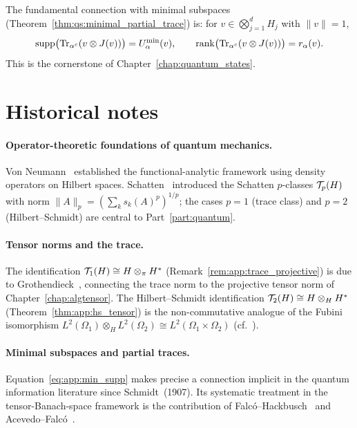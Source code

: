 \medskip\noindent
The fundamental connection with minimal subspaces
(Theorem~\ref{thm:qs:minimal_partial_trace}) is:
for $v \in \bigotimes_{j=1}^d H_j$ with $\|v\|=1$,
\begin{equation}
\label{eq:app:min_supp}
    \mathrm{supp}\bigl(\mathrm{Tr}_{\alpha^c}(v \otimes J(v))\bigr) = U^{\min}_{\alpha}(v),
    \qquad
    \mathrm{rank}\bigl(\mathrm{Tr}_{\alpha^c}(v \otimes J(v))\bigr) = r_\alpha(v).
\end{equation}
This is the cornerstone of Chapter~\ref{chap:quantum_states}.

\section{Historical notes}
\label{app:quantum:history}

\paragraph{Operator-theoretic foundations of quantum mechanics.}
Von Neumann~\cite{vonNeumann1932} established the functional-analytic
framework using density operators on Hilbert spaces. Schatten~\cite{Schatten1950}
introduced the Schatten $p$-classes $\mathcal{T}_{p}(H)$ with norm
$\|A\|_p = (\sum_k s_k(A)^p)^{1/p}$; the cases $p=1$ (trace class)
and $p=2$ (Hilbert--Schmidt) are central to Part~\ref{part:quantum}.

\paragraph{Tensor norms and the trace.}
The identification $\mathcal{T}_{1}(H) \cong H \otimes_\pi H^*$
(Remark~\ref{rem:app:trace_projective}) is due to
Grothendieck~\cite{Grothendieck1953}, connecting the trace norm to the
projective tensor norm of Chapter~\ref{chap:algtensor}. The
Hilbert--Schmidt identification $\mathcal{T}_{2}(H) \cong H \otimes_H H^*$
(Theorem~\ref{thm:app:hs_tensor}) is the non-commutative analogue of
the Fubini isomorphism $L^2(\Omega_1) \otimes_H L^2(\Omega_2) \cong
L^2(\Omega_1 \times \Omega_2)$ (cf.~\cite[Chapter~II]{ReedSimon1972}).

\paragraph{Minimal subspaces and partial traces.}
Equation~\eqref{eq:app:min_supp} makes precise a connection implicit in
the quantum information literature since Schmidt~(1907). Its systematic
treatment in the tensor-Banach-space framework is the contribution of
Falcó--Hackbusch~\cite{FH2012} and Acevedo--Falcó~\cite{AcevedoFalco2026}.
